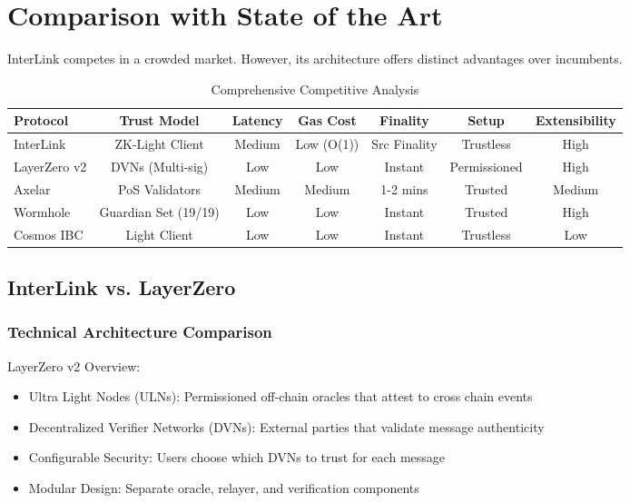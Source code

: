 \documentclass[11pt,a4paper]{article}
\begin{document}
\section{Comparison with State of the Art}
\label{sec:compare}

InterLink competes in a crowded market. However, its architecture offers distinct advantages over incumbents.

\begin{table}[H]
\centering
\footnotesize
\setlength{\tabcolsep}{4pt}
\begin{tabular}{@{}lcccccc@{}}
\toprule
Protocol & Trust Model & Latency & Gas Cost & Finality & Setup & Extensibility \\ \midrule
InterLink & ZK-Light Client & Medium & Low (O(1)) & Src Finality & Trustless & High \\
LayerZero v2 & DVNs (Multi-sig) & Low & Low & Instant & Permissioned & High \\
Axelar & PoS Validators & Medium & Medium & 1-2 mins & Trusted & Medium \\
Wormhole & Guardian Set (19/19) & Low & Low & Instant & Trusted & High \\
Cosmos IBC & Light Client & Low & Low & Instant & Trustless & Low \\ \bottomrule
\end{tabular}
\caption{Comprehensive Competitive Analysis}
\label{tab:comparison_detailed}
\end{table}

\subsection{InterLink vs. LayerZero}

\subsubsection{Technical Architecture Comparison}

LayerZero v2 Overview:
\begin{itemize}
    \item Ultra Light Nodes (ULNs): Permissioned off-chain oracles that attest to cross chain events
    \item Decentralized Verifier Networks (DVNs): External parties that validate message authenticity
    \item Configurable Security: Users choose which DVNs to trust for each message
    \item Modular Design: Separate oracle, relayer, and verification components
\end{itemize}
\end{document}
